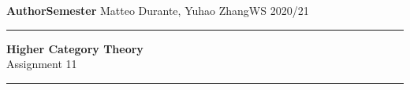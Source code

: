 \documentclass[a4paper,11pt,openany]{scrartcl}
\begin{document}
\noindent\textbf{Author}\hfill\textbf{Semester} \linebreak
\vspace*{-.1cm} Matteo Durante, Yuhao Zhang\hfill WS 2020/21 \\

\noindent
\rule{\linewidth}{1pt}
\begin{center}
\Large
\textbf{Higher Category Theory} \\
Assignment 11
\end{center}
\rule{\linewidth}{1pt}
\\


\newcommand{\La}{\Lambda}
\newcommand{\pa}{\partial}
\newcommand{\ob}{\operatorname{Ob}}
\newcommand{\mor}{\operatorname{Mor}}
\newcommand{\sto}{\twoheadrightarrow}

\newcommand{\plim}{\varprojlim}
\newcommand{\sst}{\subseteq}
\newcommand{\eq}{\operatorname{eq}}

\newcommand{\f}{\varphi}

\newcommand{\sing}{\operatorname{Sing}}

\newcommand{\ihom}{\underline{\Hom}}
\end{document}

